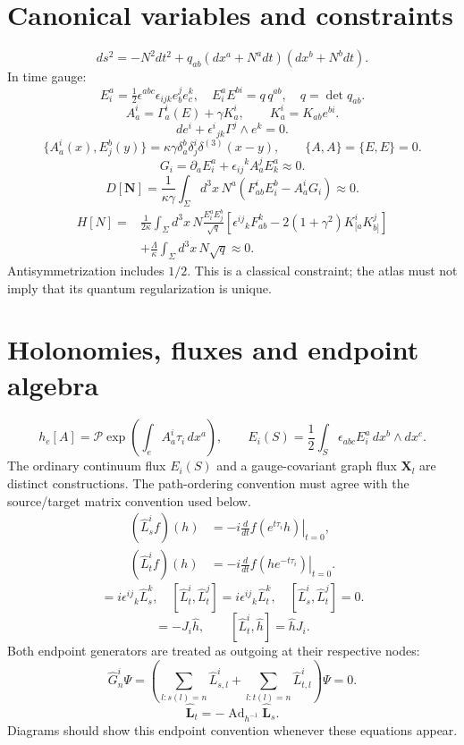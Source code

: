 \documentclass[11pt,a4paper]{article}
\newcommand{\eq}[2]{\begin{equation}#2\tag{#1}\end{equation}}
\begin{document}
\section{Canonical variables and constraints}
\eq{K1}{ds^2=-N^2dt^2+q_{ab}(dx^a+N^adt)(dx^b+N^bdt).}
In time gauge:
\eq{K2}{E^a_i=\tfrac12\epsilon^{abc}\epsilon_{ijk}e_b^je_c^k,\quad E^a_iE^{bi}=q\,q^{ab},\quad q=\det q_{ab}.}
\eq{K3}{A_a^i=\Gamma_a^i(E)+\gamma K_a^i,\qquad K_a^i=K_{ab}e^{bi}.}
\eq{K4}{de^i+\epsilon^i{}_{jk}\Gamma^j\wedge e^k=0.}
\eq{K5}{\{A_a^i(x),E^b_j(y)\}=\kappa\gamma\delta_a^b\delta^i_j\delta^{(3)}(x-y),\qquad\{A,A\}=\{E,E\}=0.}
\eq{K6}{G_i=\partial_aE^a_i+\epsilon_{ij}{}^kA_a^jE^a_k\approx0.}
\eq{K7}{D[\mathbf N]=\frac1{\kappa\gamma}\int_\Sigma d^3x\,N^a(F_{ab}^iE^b_i-A_a^iG_i)\approx0.}
\eq{K8}{\begin{aligned}
H[N]={}&\frac1{2\kappa}\int_\Sigma d^3x\,N\frac{E^a_iE^b_j}{\sqrt q}
\left[\epsilon^{ij}{}_kF_{ab}^k-2(1+\gamma^2)K_{[a}^iK_{b]}^j\right]\\
&+\frac\Lambda\kappa\int_\Sigma d^3x\,N\sqrt q\approx0.
\end{aligned}}
Antisymmetrization includes $1/2$. This is a classical constraint; the atlas must not imply that its quantum regularization is unique.

\section{Holonomies, fluxes and endpoint algebra}
\eq{H1}{h_e[A]=\mathcal P\exp\left(\int_e A_a^i\tau_i\,dx^a\right),\qquad E_i(S)=\frac12\int_S\epsilon_{abc}E_i^a\,dx^b\wedge dx^c.}
The ordinary continuum flux $E_i(S)$ and a gauge-covariant graph flux $\mathbf X_l$ are distinct constructions. The path-ordering convention must agree with the source/target matrix convention used below.
\eq{H2}{\begin{aligned}
(\hat L_s^if)(h)&=-i\left.\frac d{dt}f(e^{t\tau_i}h)\right|_{t=0},\\
(\hat L_t^if)(h)&=-i\left.\frac d{dt}f(he^{-t\tau_i})\right|_{t=0}.
\end{aligned}}
\eq{H3}{[\hat L_s^i,\hat L_s^j]=i\epsilon^{ij}{}_k\hat L_s^k,\quad[\hat L_t^i,\hat L_t^j]=i\epsilon^{ij}{}_k\hat L_t^k,\quad[\hat L_s^i,\hat L_t^j]=0.}
\eq{H4}{[\hat L_s^i,\hat h]=-J_i\hat h,\qquad[\hat L_t^i,\hat h]=\hat hJ_i.}
Both endpoint generators are treated as outgoing at their respective nodes:
\eq{H5}{\hat G_n^i\Psi=\left(\sum_{l:s(l)=n}\hat L_{s,l}^i+\sum_{l:t(l)=n}\hat L_{t,l}^i\right)\Psi=0.}
\eq{H6}{\hat{\mathbf L}_t=-\operatorname{Ad}_{h^{-1}}\hat{\mathbf L}_s.}
Diagrams should show this endpoint convention whenever these equations appear.
\end{document}
